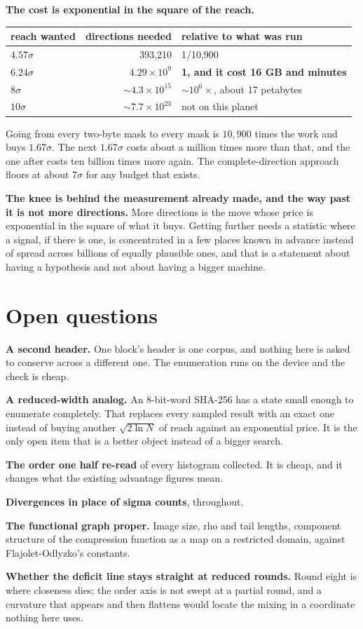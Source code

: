 \textbf{The cost is exponential in the square of the reach.}

\begin{center}
\begin{tabular}{@{}lrl@{}}
\toprule
reach wanted & directions needed & relative to what was run \\
\midrule
\(4.57\sigma\) & 393,210 & 1/10,900 \\
\textbf{\(6.24\sigma\)} & \(4.29\times10^{9}\) & \textbf{1, and it cost 16 GB and minutes} \\
\(8\sigma\) & \(\sim 4.3\times10^{15}\) & \(\sim 10^{6}\times\), about 17 petabytes \\
\(10\sigma\) & \(\sim 7.7\times10^{23}\) & not on this planet \\
\bottomrule
\end{tabular}
\end{center}

Going from every two-byte mask to every mask is \(10{,}900\) times the work and buys \(1.67\sigma\). The next \(1.67\sigma\) costs about a million times more than that, and the one after costs ten billion times more again. The complete-direction approach floors at about \(7\sigma\) for any budget that exists.

\textbf{The knee is behind the measurement already made, and the way past it is not more directions.} More directions is the move whose price is exponential in the square of what it buys. Getting further needs a statistic where a signal, if there is one, is concentrated in a few places known in advance instead of spread across billions of equally plausible ones, and that is a statement about having a hypothesis and not about having a bigger machine.

\section{Open questions}

\textbf{A second header.} One block's header is one corpus, and nothing here is asked to conserve across a different one. The enumeration runs on the device and the check is cheap.

\textbf{A reduced-width analog.} An 8-bit-word SHA-256 has a state small enough to enumerate completely. That replaces every sampled result with an exact one instead of buying another \(\sqrt{2\ln N}\) of reach against an exponential price. It is the only open item that is a better object instead of a bigger search.

\textbf{The order one half re-read} of every histogram collected. It is cheap, and it changes what the existing advantage figures mean.

\textbf{Divergences in place of sigma counts}, throughout.

\textbf{The functional graph proper.} Image size, rho and tail lengths, component structure of the compression function as a map on a restricted domain, against Flajolet-Odlyzko's constants.

\textbf{Whether the deficit line stays straight at reduced rounds.} Round eight is where closeness dies; the order axis is not swept at a partial round, and a curvature that appears and then flattens would locate the mixing in a coordinate nothing here uses.
